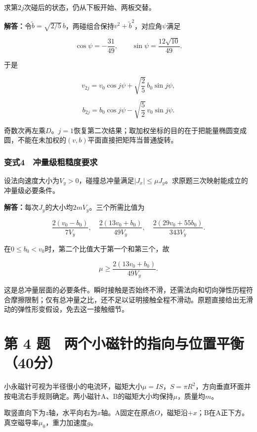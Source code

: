 \documentclass[12pt,a4paper,fontset=fandol]{ctexart}
\begin{document}
求第\(2j\)次碰后的状态，仍从下板开始、两板交替。

\textbf{解答：}令\(\widetilde b=\sqrt{2/5}\,b\)，两碰组合保持\(v^2+\widetilde b^2\)，对应角\(\psi\)满足

\[
\cos\psi=-\frac{31}{49},\qquad
\sin\psi=\frac{12\sqrt{10}}{49}.
\]

于是

\[
v_{2j}=v_0\cos j\psi+\sqrt{\frac25}\,b_0\sin j\psi,
\]

\[
b_{2j}=b_0\cos j\psi-\sqrt{\frac52}\,v_0\sin j\psi.
\]

奇数次再左乘\(D\)。\(j=1\)恢复第二次结果；取加权坐标的目的在于把能量椭圆变成圆，不能在未加权的\((v,b)\)平面直接把矩阵当普通旋转。

\subsubsection{变式4　冲量级粗糙度要求}\label{ux53d8ux5f0f4-ux51b2ux91cfux7ea7ux7c97ux7cd9ux5ea6ux8981ux6c42}

设法向速度大小为\(V_y>0\)，碰撞总冲量满足\(|J_x|\leq\mu J_y\)。求原题三次映射能成立的冲量级必要条件。

\textbf{解答：}每次\(J_y\)的大小均\(2mV_y\)。三个所需比值为

\[
\frac{2(v_0-b_0)}{7V_y},\quad
\frac{2(13v_0+b_0)}{49V_y},\quad
\frac{2(29v_0+55b_0)}{343V_y}.
\]

在\(0\leq b_0<v_0\)时，第二个比值大于第一个和第三个，故

\[
\mu\geq\frac{2(13v_0+b_0)}{49V_y}.
\]

这是总冲量层面的必要条件。瞬时接触是否始终不滑，还需法向和切向弹性历程符合摩擦限制；仅有总冲量之比，还不足以证明接触全程不滑动。原题直接给出无滑动的弹性形变假设，免去这一接触细节。

\clearpage

\section{第 4
题　两个小磁针的指向与位置平衡（40分）}\label{ux7b2c-4-ux9898-ux4e24ux4e2aux5c0fux78c1ux9488ux7684ux6307ux5411ux4e0eux4f4dux7f6eux5e73ux886140ux5206}

小永磁针可视为半径很小的电流环，磁矩大小\(\mu=IS\)，\(S=\pi R^2\)，方向垂直环面并按电流右手规则确定。两小磁针A、B的磁矩大小均保持\(\mu\)，质量均\(m\)。

取竖直向下为\(z\)轴，水平向右为\(x\)轴。A固定在原点\(O\)，磁矩沿\(+x\)；B在A正下方。真空磁导率\(\mu_0\)，重力加速度\(g\)。
\end{document}
